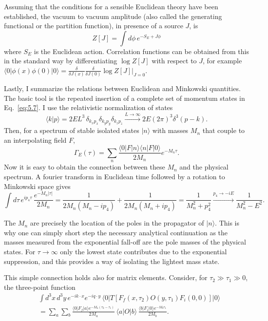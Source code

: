 Assuming that the conditions for a sensible Euclidean theory have been established, the vacuum to vacuum amplitude (also called the generating functional or the partition function), in presence of a source $J$, is
\begin{equation}
Z[J] = \int d\phi\, e^{-S_E + J\phi}
\label{eq:5.9}
\end{equation}
where $S_E$ is the Euclidean action. Correlation functions can be obtained from this in the standard way by differentiating $\log Z[J]$ with respect to $J$, for example $\langle 0|\phi(x)\phi(0)|0\rangle = \frac{\delta}{\delta J(x)} \frac{\delta}{\delta J(0)} \log Z[J]\big|_{J=0}$.

Lastly, I summarize the relations between Euclidean and Minkowski quantities. The basic tool is the repeated insertion of a complete set of momentum states in Eq.~\eqref{eq:5.7}. I use the relativistic normalization of states
\begin{equation}
\langle k|p\rangle = 2E L^3\, \delta_{k_x p_x} \delta_{k_y p_y} \delta_{k_z p_z} \xrightarrow{L\to\infty} 2E(2\pi)^3 \delta^3(p-k) .
\label{eq:5.10}
\end{equation}
Then, for a spectrum of stable isolated states $|n\rangle$ with masses $M_n$ that couple to an interpolating field $F$,
\begin{equation}
\Gamma_E(\tau) = \sum_n \frac{\langle 0|F|n\rangle \langle n|F|0\rangle}{2M_n} e^{-M_n \tau} .
\label{eq:5.11}
\end{equation}
Now it is easy to obtain the connection between these $M_n$ and the physical spectrum. A fourier transform in Euclidean time followed by a rotation to Minkowski space gives
\begin{equation}
\int d\tau\, e^{ip_4 \tau}\, \frac{e^{-M_n |\tau|}}{2M_n}
= \frac{1}{2M_n (M_n - ip_4)} + \frac{1}{2M_n (M_n + ip_4)}
= \frac{1}{M_n^2 + p_4^2}
\xrightarrow{p_4 \to -iE} \frac{1}{M_n^2 - E^2} .
\label{eq:5.12}
\end{equation}

The $M_n$ are precisely the location of the poles in the propagator of $|n\rangle$. This is why one can simply short step the necessary analytical continuation as the masses measured from the exponential fall-off are the pole masses of the physical states. For $\tau \to \infty$ only the lowest state contributes due to the exponential suppression, and this provides a way of isolating the lightest mass state.

This simple connection holds also for matrix elements. Consider, for $\tau_2 \gg \tau_1 \gg 0$, the three-point function
\begin{equation}
\begin{aligned}
&\int d^3x\, d^3y\, e^{-ik\cdot x} e^{-iq\cdot y}\, \langle 0| T[F_f(x,\tau_2) O(y,\tau_1) F_i(0,0)] |0\rangle \\
&= \sum_a \sum_b \frac{\langle 0|F_f|a\rangle e^{-M_a (\tau_2 - \tau_1)}}{2M_a}\, \langle a|O|b\rangle\, \frac{\langle b|F_i|0\rangle e^{-M_b \tau_1}}{2M_b} .
\end{aligned}
\label{eq:5.13}
\end{equation}

